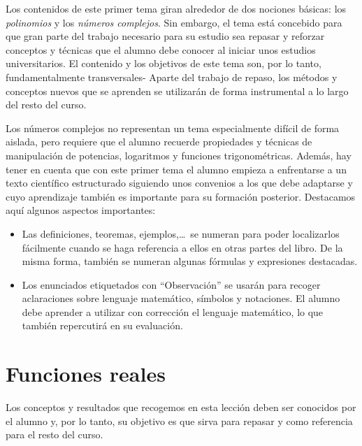 Los contenidos de este primer tema giran alrededor de dos nociones básicas: los \emph{polinomios} y los \emph{números complejos}. Sin embargo, el tema está concebido para que gran parte del trabajo necesario para su estudio sea repasar y reforzar conceptos y técnicas que el alumno debe conocer al iniciar unos estudios universitarios.
El contenido y los objetivos de este tema son, por lo tanto, fundamentalmente transversales-
Aparte del trabajo de repaso, los métodos y conceptos nuevos que se aprenden se utilizarán de forma instrumental a lo largo del resto del curso.

Los números complejos no representan un tema especialmente difícil de forma aislada, pero requiere que el alumno recuerde propiedades y técnicas de manipulación de potencias, logaritmos y funciones trigonométricas.
Además, hay tener en cuenta que con este primer tema el alumno empieza a enfrentarse a un texto científico estructurado siguiendo unos convenios a los que debe adaptarse y cuyo aprendizaje también es importante para su formación posterior.
Destacamos aquí algunos aspectos importantes:

\begin{itemize}
\item
Las definiciones, teoremas, ejemplos,\dots\ se numeran para poder localizarlos fácilmente cuando se haga referencia a ellos en otras partes del libro.
De la misma forma, también se numeran algunas fórmulas y expresiones destacadas.

\item
Los enunciados etiquetados con ``Observación'' se usarán para recoger aclaraciones sobre lenguaje matemático, símbolos y notaciones.
El alumno debe aprender a utilizar con corrección el lenguaje matemático, lo que también repercutirá en su evaluación.
\end{itemize}

\newpage

%
%


\section{Funciones reales}

Los conceptos y resultados que recogemos en esta lección deben ser conocidos por el alumno y, por lo tanto, su objetivo es que sirva para repasar y como referencia para el resto del curso.

